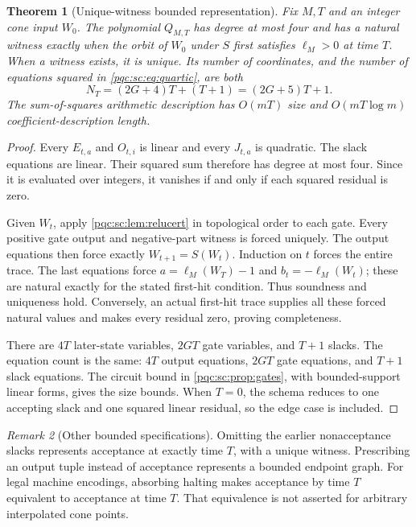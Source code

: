 \documentclass[11pt,letterpaper]{article}
\numberwithin{equation}{section}
\newtheorem{theorem}{Theorem}[section]
\theoremstyle{definition}
\theoremstyle{remark}
\newtheorem{remark}[theorem]{Remark}
\begin{document}
\begin{theorem}[Unique-witness bounded representation]\label{pqc:sc:thm:quartic}
Fix $M,T$ and an integer cone input $W_0$. The polynomial
$Q_{M,T}$ has degree at most four and has a natural witness exactly when
the orbit of $W_0$ under $S$ first satisfies $\ell_M>0$ at time $T$.
When a witness exists, it is unique. Its number of coordinates, and the
number of equations squared in \eqref{pqc:sc:eq:quartic}, are both
\begin{equation}\label{pqc:sc:eq:witnesscount}
 N_T=(2G+4)T+(T+1)=(2G+5)T+1.
\end{equation}
The sum-of-squares arithmetic description has $O(mT)$ size and
$O(mT\log m)$ coefficient-description length.
\end{theorem}
\begin{proof}
Every $E_{t,a}$ and $O_{t,i}$ is linear and every $J_{t,a}$ is quadratic.
The slack equations are linear. Their squared sum therefore has degree at
most four. Since it is evaluated over integers, it vanishes if and only if
each squared residual is zero.

Given $W_t$, apply \cref{pqc:sc:lem:relucert} in topological order to each gate.
Every positive gate output and negative-part witness is forced uniquely.
The output equations then force exactly $W_{t+1}=S(W_t)$. Induction on $t$
forces the entire trace. The last equations force
$a=\ell_M(W_T)-1$ and $b_t=-\ell_M(W_t)$; these are natural exactly for
the stated first-hit condition. Thus soundness and uniqueness hold.
Conversely, an actual first-hit trace supplies all these forced natural
values and makes every residual zero, proving completeness.

There are $4T$ later-state variables, $2GT$ gate variables, and $T+1$
slacks. The equation count is the same: $4T$ output equations, $2GT$ gate
equations, and $T+1$ slack equations. The circuit bound in
\cref{pqc:sc:prop:gates}, with bounded-support linear forms, gives the size bounds.
When $T=0$, the schema reduces to one accepting slack and one squared
linear residual, so the edge case is included.
\end{proof}

\begin{remark}[Other bounded specifications]
Omitting the earlier nonacceptance slacks represents acceptance at exactly
time $T$, with a unique witness. Prescribing an output tuple instead of
acceptance represents a bounded endpoint graph. For legal machine
encodings, absorbing halting makes acceptance by time $T$ equivalent to
acceptance at time $T$. That equivalence is not asserted for arbitrary
interpolated cone points.
\end{remark}
\end{document}
